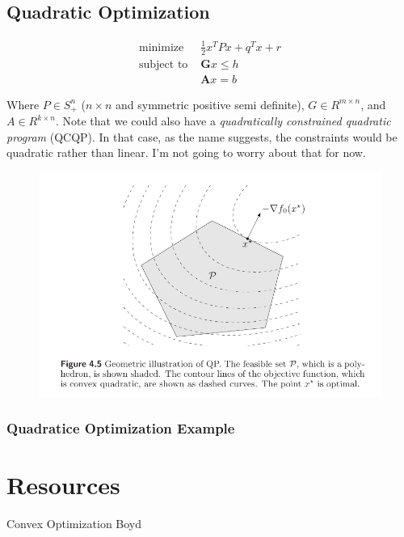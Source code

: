 \documentclass{article}
\begin{document}
\subsection{Quadratic Optimization}

\begin{align}
    \text{minimize }   & \frac{1}{2} x^T P x + q^T x + r \\
    \text{subject to } & \boldsymbol{G} x \le h          \\
                       & \boldsymbol{A} x = b
\end{align}

\noindent
Where $P \in S^{n}_{+}$ ($n \times n$ and symmetric positive semi definite), $G \in R^{m \times n}$, and $A \in R^{k \times n}$.
Note that we could also have a {\em quadratically constrained quadratic program\/} (QCQP). In that case, as the name suggests, the constraints would be quadratic rather than linear. I'm not going to worry about that for now.

\begin{figure}[h!]
    \centering
    \includegraphics[width=1\textwidth]{./figures/QuadraticOptimizationIllustration.png}
\end{figure}

\subsubsection{Quadratice Optimization Example}



\section{Resources}

Convex Optimization Boyd




\end{document}
